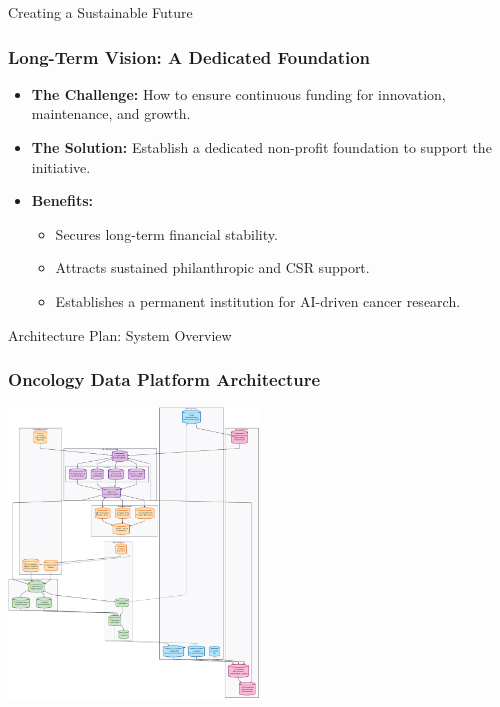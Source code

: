 \documentclass{beamer}
\begin{document}
\begin{frame}{Creating a Sustainable Future}
    \frametitle{Long-Term Vision: A Dedicated Foundation}
    \begin{itemize}
        \item \textbf{The Challenge:} How to ensure continuous funding for innovation, maintenance, and growth.
        \item \textbf{The Solution:} Establish a dedicated non-profit foundation to support the initiative.
        \item \textbf{Benefits:}
        \begin{itemize}
            \item Secures long-term financial stability.
            \item Attracts sustained philanthropic and CSR support.
            \item Establishes a permanent institution for AI-driven cancer research.
        \end{itemize}
    \end{itemize}
\end{frame}

\begin{frame}{Architecture Plan: System Overview}
    \frametitle{Oncology Data Platform Architecture}
    \begin{center}
        \includegraphics[width=0.5\textwidth]{oncology_platform.png}
    \end{center}
\end{frame}
\end{document}
